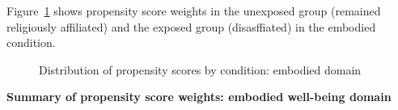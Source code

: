\documentclass[
  singlecolumn,
  9pt]{article}
\begin{document}
Figure~\ref{fig-propensity-dis-embodied} shows propensity score weights
in the unexposed group (remained religiously affiliated) and the exposed
group (disasffiated) in the embodied condition.

\begin{figure}


\caption{\label{fig-propensity-dis-embodied}Distribution of propensity
scores by condition: embodied domain}

\end{figure}%

\textbf{Summary of propensity score weights: embodied well-being domain}
\end{document}
